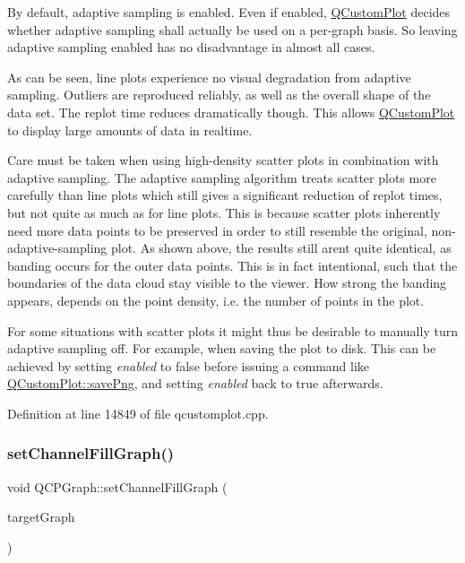 By default, adaptive sampling is enabled. Even if enabled, \hyperlink{class_q_custom_plot}{Q\+Custom\+Plot} decides whether adaptive sampling shall actually be used on a per-\/graph basis. So leaving adaptive sampling enabled has no disadvantage in almost all cases.

 As can be seen, line plots experience no visual degradation from adaptive sampling. Outliers are reproduced reliably, as well as the overall shape of the data set. The replot time reduces dramatically though. This allows \hyperlink{class_q_custom_plot}{Q\+Custom\+Plot} to display large amounts of data in realtime.

 Care must be taken when using high-\/density scatter plots in combination with adaptive sampling. The adaptive sampling algorithm treats scatter plots more carefully than line plots which still gives a significant reduction of replot times, but not quite as much as for line plots. This is because scatter plots inherently need more data points to be preserved in order to still resemble the original, non-\/adaptive-\/sampling plot. As shown above, the results still aren\textquotesingle{}t quite identical, as banding occurs for the outer data points. This is in fact intentional, such that the boundaries of the data cloud stay visible to the viewer. How strong the banding appears, depends on the point density, i.\+e. the number of points in the plot.

For some situations with scatter plots it might thus be desirable to manually turn adaptive sampling off. For example, when saving the plot to disk. This can be achieved by setting {\itshape enabled} to false before issuing a command like \hyperlink{class_q_custom_plot_a7636261aff1f6d25c9da749ece3fc8b8}{Q\+Custom\+Plot\+::save\+Png}, and setting {\itshape enabled} back to true afterwards. 

Definition at line 14849 of file qcustomplot.\+cpp.

\mbox{\label{class_q_c_p_graph_a2d03156df1b64037a2e36cfa50351ca3}} 
\subsubsection{\texorpdfstring{set\+Channel\+Fill\+Graph()}{setChannelFillGraph()}}
{\footnotesize\ttfamily void Q\+C\+P\+Graph\+::set\+Channel\+Fill\+Graph (\begin{DoxyParamCaption}\item[{\hyperlink{class_q_c_p_graph}{Q\+C\+P\+Graph} $\ast$}]{target\+Graph }\end{DoxyParamCaption})}

